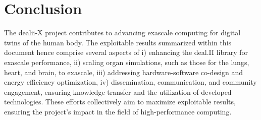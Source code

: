 \documentclass[a4paper,12pt]{article}
\begin{document}
\section{{Conclusion}} \label{sec:conclusion}

The dealii-X project contributes to advancing exascale computing for digital twins of the human body. The exploitable results summarized within this document hence comprise several aspects of i) enhancing the deal.II library for exascale performance, ii) scaling organ simulations, such as those for the lungs, heart, and brain, to exascale, iii) addressing hardware-software co-design and energy efficiency optimization, iv) dissemination, communication, and community engagement, ensuring knowledge transfer and the utilization of developed technologies. These efforts collectively aim to maximize exploitable results, ensuring the project’s impact in the field of high-performance computing.

\label{MyLastPage}
\end{document}
